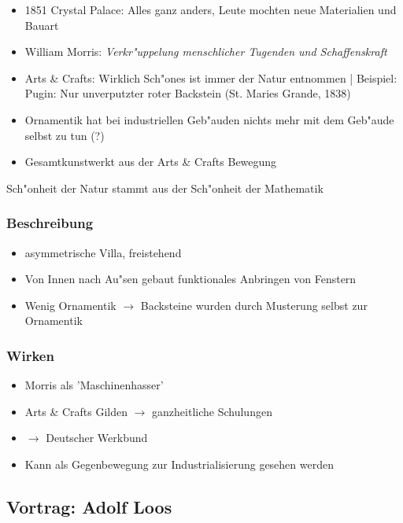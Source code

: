 \documentclass[emulatestandardclasses]{scrartcl}
\begin{document}
\begin{itemize}
  \item 1851 Crystal Palace: Alles ganz anders, Leute mochten neue Materialien und Bauart
  \item William Morris: \emph{Verkr"uppelung menschlicher Tugenden und Schaffenskraft}
  \item Arts \& Crafts: Wirklich Sch"ones ist immer der Natur entnommen | Beispiel: Pugin: Nur unverputzter roter Backstein (St. Maries Grande, 1838)
  \item Ornamentik hat bei industriellen Geb"auden nichts mehr mit dem Geb"aude selbst zu tun (?)
  \item Gesamtkunstwerkt aus der Arts \& Crafts Bewegung

\end{itemize}

Sch"onheit der Natur stammt aus der Sch"onheit der Mathematik

\subsubsection{Beschreibung}

\begin{itemize}
  \item asymmetrische Villa, freistehend
  \item Von Innen nach Au"sen gebaut funktionales Anbringen von Fenstern
  \item Wenig Ornamentik $\rightarrow$ Backsteine wurden durch Musterung selbst zur Ornamentik
\end{itemize}


\subsubsection{Wirken}

\begin{itemize}
  \item Morris als 'Maschinenhasser'
  \item Arts \& Crafts Gilden $\rightarrow$  ganzheitliche Schulungen
  \item $\rightarrow$ Deutscher Werkbund
  \item Kann als Gegenbewegung zur Industrialisierung gesehen werden
\end{itemize}

\subsection{Vortrag: Adolf Loos}
\end{document}

